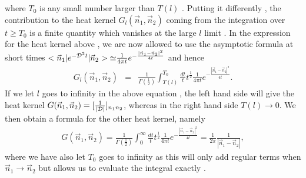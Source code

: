 \documentclass[a4paper,10pt]{article}
\begin{document}
where $T_0$ is any small number larger than $T(l)$ . Putting it
differently , the contribution to the heat kernel
$G_l(\vec{n}_1,\vec{n}_2)$ coming from the integration over
$t{\geq}T_0$ is a finite quantity which vanishes at the large $l$
limit . In the expression for the heat kernel above , we are now
allowed to use the asymptotic formula at short times $
<\vec{n}_1|e^{-{\cal
D}^2t}|\vec{n}_2>{\simeq}\frac{1}{4{\pi}t}e^{-\frac{|\vec{n}_1-\vec{n}_2|^2}{4t}}
$ and hence \cite{denjoe,heat}
\begin{eqnarray}
G_l(\vec{n}_1,\vec{n}_2)&=&\frac{1}{{\Gamma}(\frac{1}{2})}\int_{T(l)}^{T_0}\frac{dt}{t}t^{\frac{1}{2}}\frac{1}{4{\pi}t}e^{-\frac{|\vec{n}_1-\vec{n}_2|^2}{4t}}.
\end{eqnarray}
If we let $l$ goes to infinity in the above equation , the left
hand side will give the heat kernel
$G(\vec{n}_1,\vec{n}_2)=[\frac{1}{|{\cal D}|}]_{n_1n_2}$,
whereas in the right hand side $T(l){\longrightarrow}0$. We then
obtain a formula for the other heat kernel, namely
\begin{eqnarray}
G(\vec{n}_1,\vec{n}_2)=\frac{1}{{\Gamma}(\frac{1}{2})}\int_{0}^{\infty}\frac{dt}{t}t^{\frac{1}{2}}\frac{1}{4{\pi}t}e^{-\frac{|\vec{n}_1-\vec{n}_2|^2}{4t}}=\frac{1}{2{\pi}}\frac{1}{|\vec{n}_1-\vec{n}_2|},
\end{eqnarray}
where we have also let $T_0$ goes to infinity as this will only
add regular terms when $\vec{n}_1{\longrightarrow}\vec{n}_2$ but
allows us to evaluate the integral exactly .
\end{document}
